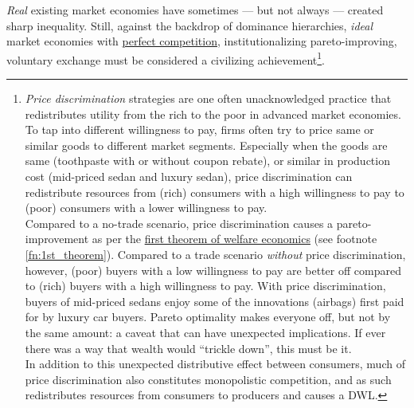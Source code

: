 \emph{Real} existing market economies have sometimes --- but not always --- created sharp inequality. Still, against the backdrop of dominance hierarchies, \emph{ideal} market economies with \hyperref[fn:perfect_competition]{perfect competition}, institutionalizing pareto-improving, voluntary exchange must be considered a civilizing achievement\footnote{
	\emph{Price discrimination} strategies are one often unacknowledged practice that redistributes utility from the rich to the poor in advanced market economies. To tap into different willingness to pay, firms often try to price same or similar goods to different market segments. Especially when the goods are same (toothpaste with or without coupon rebate), or similar in production cost (mid-priced sedan and luxury sedan), price discrimination can redistribute resources from (rich) consumers with a high willingness to pay to (poor) consumers with a lower willingness to pay.\\
	Compared to a no-trade scenario, price discrimination causes a pareto-improvement as per the \hyperref[fn:1st_theorem]{first theorem of welfare economics} (see footnote \ref{fn:1st_theorem}). Compared to a trade scenario \emph{without} price discrimination, however, (poor) buyers with a low willingness to pay are better off compared to (rich) buyers with a high willingness to pay. With price discrimination, buyers of mid-priced sedans enjoy some of the innovations (airbags) first paid for by luxury car buyers. Pareto optimality makes everyone off, but not by the same amount: a caveat that can have unexpected implications. If ever there was a way that wealth would ``trickle down'', this must be it.\\
	In addition to this unexpected distributive effect between consumers, much of price discrimination also constitutes monopolistic competition, and as such redistributes resources from consumers to producers and causes a \gls{DWL}.}.%

